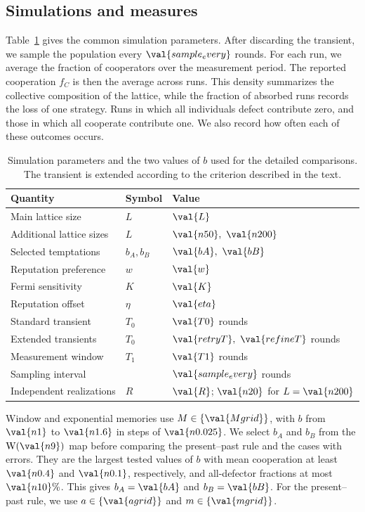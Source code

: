 \documentclass[physics,article,submit,moreauthors]{Definitions/mdpi}
\newcommand{\W}{\mathrm{W}}
\begin{document}
\subsection{Simulations and measures}
Table~\ref{tab:parameters} gives the common simulation parameters. After discarding the transient, we sample the population every $\val{sample_every}$ rounds. For each run, we average the fraction of cooperators over the measurement period. The reported cooperation $f_C$ is then the average across runs. This density summarizes the collective composition of the lattice, while the fraction of absorbed runs records the loss of one strategy. Runs in which all individuals defect contribute zero, and those in which all cooperate contribute one. We also record how often each of these outcomes occurs.

\begin{table}[htbp]
\centering
\caption{Simulation parameters and the two values of $b$ used for the detailed comparisons. The transient is extended according to the criterion described in the text.}
\label{tab:parameters}
\begin{tabular}{lll}\toprule
Quantity & Symbol & Value \\\midrule
Main lattice size & $L$ & $\val{L}$ \\
Additional lattice sizes & $L$ & $\val{n50},\ \val{n200}$ \\
Selected temptations & $b_A,b_B$ & $\val{bA},\ \val{bB}$ \\
Reputation preference & $w$ & $\val{w}$ \\
Fermi sensitivity & $K$ & $\val{K}$ \\
Reputation offset & $\eta$ & $\val{eta}$ \\
Standard transient & $T_0$ & $\val{T0}$ rounds \\
Extended transients & $T_0$ & $\val{retryT},\ \val{refineT}$ rounds \\
Measurement window & $T_1$ & $\val{T1}$ rounds \\
Sampling interval & & $\val{sample_every}$ rounds \\
Independent realizations & $R$ & $\val{R}$; $\val{n20}$ for $L=\val{n200}$ \\\bottomrule
\end{tabular}
\end{table}

Window and exponential memories use $M\in\{\val{Mgrid}\}$, with $b$ from $\val{n1}$ to $\val{n1.6}$ in steps of $\val{n0.025}$. We select $b_A$ and $b_B$ from the $\W(\val{n9})$ map before comparing the present--past rule and the cases with errors. They are the largest tested values of $b$ with mean cooperation at least $\val{n0.4}$ and $\val{n0.1}$, respectively, and all-defector fractions at most $\val{n10}\%$. This gives $b_A=\val{bA}$ and $b_B=\val{bB}$. For the present--past rule, we use $a\in\{\val{agrid}\}$ and $m\in\{\val{mgrid}\}$.
\end{document}
